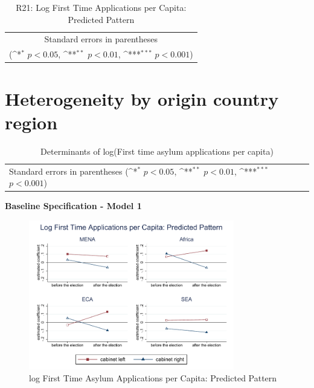 \documentclass[10pt,a4paper]{scrartcl}
\begin{document}
\begin{table}[!ht]\centering
	\footnotesize
	\renewcommand{\arraystretch}{1.2}
	\def\sym#1{\ifmmode^{#1}\else\(^{#1}\)\fi}
	\caption{R21: Log First Time Applications per Capita: Predicted Pattern}
	\begin{tabular}{l*{2}{c}}
		\hline\hline
		
		\hline\hline
		\multicolumn{3}{c}{\footnotesize Standard errors in parentheses} \\
		\multicolumn{3}{c}{\footnotesize (\sym{*} \(p<0.05\), \sym{**} \(p<0.01\), \sym{***} \(p<0.001\))} \\
	\end{tabular}
\end{table}


\clearpage
\FloatBarrier
\section{Heterogeneity by origin country region}
\begin{table}[!ht]\centering
	\renewcommand{\arraystretch}{1.25}
	\small
	\def\sym#1{\ifmmode^{#1}\else\(^{#1}\)\fi}
	\caption{Determinants of log(First time asylum applications per capita)}
	\begin{tabular}{l*{4}{c}}
		\hline\hline
		
		\hline\hline
		\multicolumn{5}{l}{\footnotesize Standard errors in parentheses (\sym{*} \(p<0.05\), \sym{**} \(p<0.01\), \sym{***} \(p<0.001\))}\\
	\end{tabular}
\end{table}

\clearpage
\textbf{Baseline Specification - Model 1}
\begin{figure}[!ht]
	\centering
	\includegraphics[width=0.8\textwidth]{figures_edited/app_graph1_by_region.pdf}
	\caption{log First Time Asylum Applications per Capita: Predicted Pattern}
\end{figure}
\end{document}
